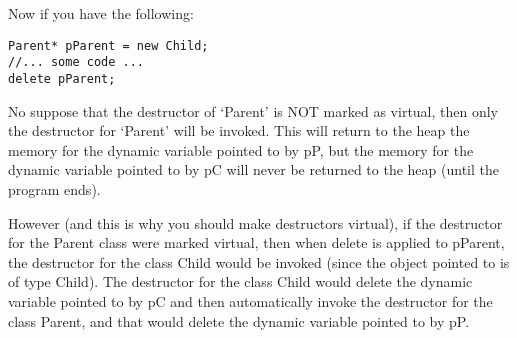 Now if you have the following:
\begin{verbatim}
Parent* pParent = new Child;
//... some code ...
delete pParent;
\end{verbatim}

No suppose that the destructor of `Parent' is NOT marked as virtual, then only the destructor
for `Parent' will be invoked. This will return to the heap the memory for the dynamic variable
pointed to by pP, but the memory for the dynamic variable pointed to by pC will never be returned
to the heap (until the program ends).

However (and this is why you should make destructors virtual), if the destructor for the Parent
class were marked virtual, then when delete is applied to pParent, the destructor for the class Child
would be invoked (since the object pointed to is of type Child). The destructor for the class
Child would delete the dynamic variable pointed to by pC and then automatically invoke the
destructor for the class Parent, and that would delete the dynamic variable pointed to by pP.








